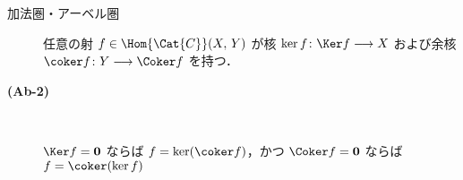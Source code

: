 \documentclass[TQFT_main]{subfiles}
\begin{document}
\begin{mydef}[label=def:additive-cat,breakable]{加法圏・アーベル圏}
\begin{description}
            任意の射 $f \in \Hom{\Cat{C}}(X,\, Y)$ が核 $\ker f \colon \Ker f \lto X$ および余核 $\coker f \colon Y \lto \Coker f$ を持つ．

            \item[\textbf{(Ab-2)}]　
            
            $\Ker f = \bm{0}$ ならば $f = \ker (\coker f)$，かつ $\Coker f = \bm{0}$ ならば $f = \coker (\ker f)$
        \end{description}
        
    \end{mydef}

\end{document}
